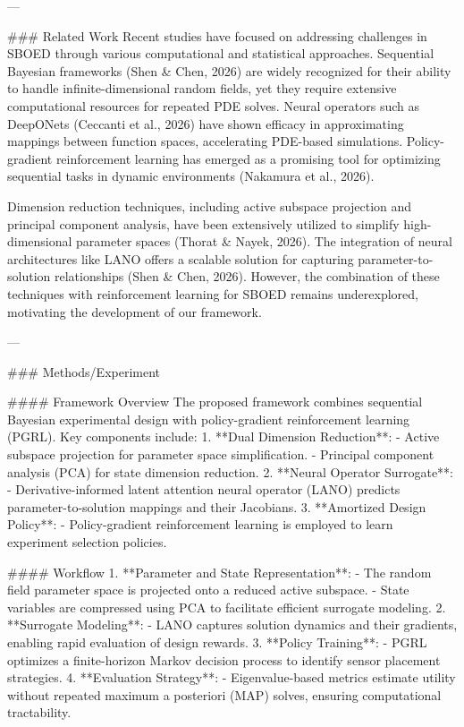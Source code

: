 ---

### Related Work
Recent studies have focused on addressing challenges in SBOED through various computational and statistical approaches. Sequential Bayesian frameworks (Shen & Chen, 2026) are widely recognized for their ability to handle infinite-dimensional random fields, yet they require extensive computational resources for repeated PDE solves. Neural operators such as DeepONets (Ceccanti et al., 2026) have shown efficacy in approximating mappings between function spaces, accelerating PDE-based simulations. Policy-gradient reinforcement learning has emerged as a promising tool for optimizing sequential tasks in dynamic environments (Nakamura et al., 2026).

Dimension reduction techniques, including active subspace projection and principal component analysis, have been extensively utilized to simplify high-dimensional parameter spaces (Thorat & Nayek, 2026). The integration of neural architectures like LANO offers a scalable solution for capturing parameter-to-solution relationships (Shen & Chen, 2026). However, the combination of these techniques with reinforcement learning for SBOED remains underexplored, motivating the development of our framework.

---

### Methods/Experiment

#### Framework Overview
The proposed framework combines sequential Bayesian experimental design with policy-gradient reinforcement learning (PGRL). Key components include:
1. **Dual Dimension Reduction**:
   - Active subspace projection for parameter space simplification.
   - Principal component analysis (PCA) for state dimension reduction.
2. **Neural Operator Surrogate**:
   - Derivative-informed latent attention neural operator (LANO) predicts parameter-to-solution mappings and their Jacobians.
3. **Amortized Design Policy**:
   - Policy-gradient reinforcement learning is employed to learn experiment selection policies.

#### Workflow
1. **Parameter and State Representation**:
   - The random field parameter space is projected onto a reduced active subspace.
   - State variables are compressed using PCA to facilitate efficient surrogate modeling.
2. **Surrogate Modeling**:
   - LANO captures solution dynamics and their gradients, enabling rapid evaluation of design rewards.
3. **Policy Training**:
   - PGRL optimizes a finite-horizon Markov decision process to identify sensor placement strategies.
4. **Evaluation Strategy**:
   - Eigenvalue-based metrics estimate utility without repeated maximum a posteriori (MAP) solves, ensuring computational tractability.


